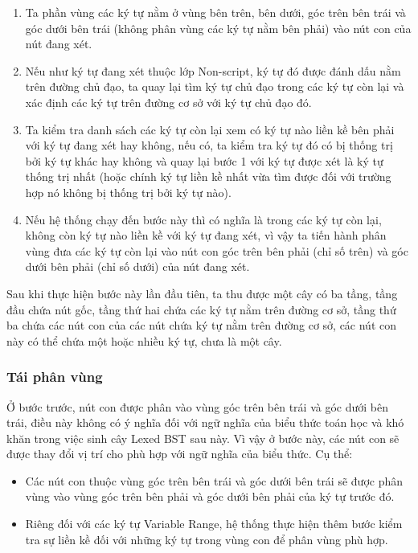 \documentclass[a4paper,12pt]{article}
\begin{document}
	\begin{enumerate}
		\item Ta phần vùng các ký tự nằm ở vùng bên trên, bên dưới, góc trên bên trái và góc dưới bên trái (không phân vùng các ký tự nằm bên phải) vào nút con của nút đang xét.
		\item Nếu như ký tự đang xét thuộc lớp Non-script, ký tự đó được đánh dấu nằm trên đường chủ đạo\cite{zanibbi}, ta quay lại tìm ký tự chủ đạo\cite{zanibbi} trong các ký tự còn lại và xác định các ký tự trên đường cơ sở với ký tự chủ đạo\cite{zanibbi} đó.
		\item Ta kiểm tra danh sách các ký tự còn lại xem có ký tự nào liền kề bên phải với ký tự đang xét hay không, nếu có, ta kiểm tra ký tự đó có bị thống trị bởi ký tự khác hay không và quay lại bước 1 với ký tự được xét là ký tự thống trị nhất (hoặc chính ký tự liền kề nhất vừa tìm được đối với trường hợp nó không bị thống trị bởi ký tự nào).
		\item Nếu hệ thống chạy đến bước này thì có nghĩa là trong các ký tự còn lại, không còn ký tự nào liền kề với ký tự đang xét, vì vậy ta tiến hành phân vùng đưa các ký tự còn lại vào nút con góc trên bên phải (chỉ số trên) và góc dưới bên phải (chỉ số dưới) của nút đang xét.
	\end{enumerate}
	
	Sau khi thực hiện bước này lần đầu tiên, ta thu được một cây có ba tầng, tầng đầu chứa nút gốc, tầng thứ hai chứa các ký tự nằm trên đường cơ sở, tầng thứ ba chứa các nút con của các nút chứa ký tự nằm trên đường cơ sở, các nút con này có thể chứa một hoặc nhiều ký tự, chưa là một cây.
	
	\subsubsection*{Tái phân vùng}
	Ở bước trước, nút con được phân vào vùng góc trên bên trái và góc dưới bên trái, điều này không có ý nghĩa đối với ngữ nghĩa của biểu thức toán học và khó khăn trong việc sinh cây Lexed BST\cite{zanibbi} sau này. Vì vậy ở bước này, các nút con sẽ được thay đổi vị trí cho phù hợp với ngữ nghĩa của biểu thức. Cụ thể:
	
	\begin{itemize}
		\item Các nút con thuộc vùng góc trên bên trái và góc dưới bên trái sẽ được phân vùng vào vùng góc trên bên phải và góc dưới bên phải của ký tự trước đó.
		\item Riêng đối với các ký tự Variable Range, hệ thống thực hiện thêm bước kiểm tra sự liền kề đối với những ký tự trong vùng con để phân vùng phù hợp.
	\end{itemize}
	
\end{document}
